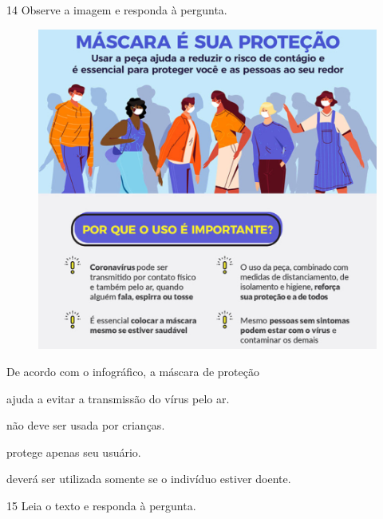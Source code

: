 \pagebreak
\num{14} Observe a imagem e responda à pergunta.

\begin{figure}[hbtp!]
\centering
\includegraphics[width=.9\textwidth]{./imgQ4PORT/media/image2.png}
\end{figure}


De acordo com o infográfico, a máscara de proteção

\begin{escolha}
  \item ajuda a evitar a transmissão do vírus pelo ar.

  \item não deve ser usada por crianças.

  \item protege apenas seu usuário.

  \item deverá ser utilizada somente se o indivíduo estiver doente.
\end{escolha}

\pagebreak
\num{15} Leia o texto e responda à pergunta.

